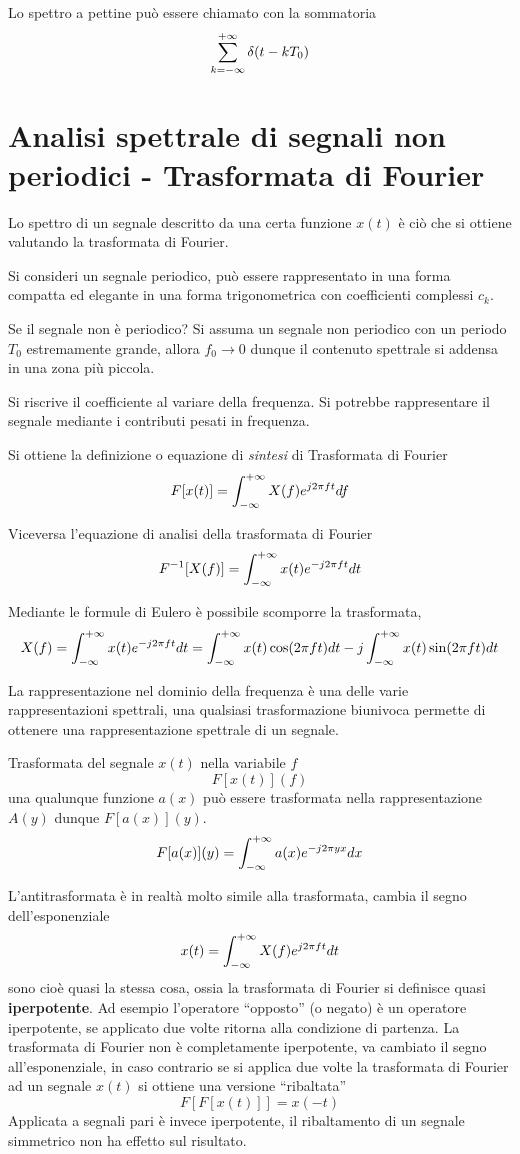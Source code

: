 Lo spettro a pettine può essere chiamato con la sommatoria
$$
\sum_{k=-\infty}^{+\infty} \delta(t-kT_0)
$$


\section{Analisi spettrale di segnali non periodici - Trasformata di Fourier}
Lo spettro di un segnale descritto da una certa funzione $x(t)$ è ciò che si
ottiene valutando la trasformata di Fourier.

Si consideri un segnale periodico, può essere rappresentato in una forma
compatta ed elegante in una forma trigonometrica con coefficienti complessi
$c_k$.

Se il segnale non è periodico? Si assuma un segnale non periodico con un
periodo $T_0$ estremamente grande, allora $f_0\to 0 $ dunque il contenuto
spettrale si addensa in una zona più piccola.

Si riscrive il coefficiente al variare della frequenza. Si potrebbe
rappresentare il segnale mediante i contributi pesati in frequenza.

Si ottiene la definizione o equazione di \textit{sintesi} di Trasformata di
Fourier
$$
F[x(t)] = \int_{-\infty}^{+\infty} X(f) e^{j2\pi ft} df
$$

Viceversa l'equazione di analisi della trasformata di Fourier
$$
F^{-1}[X(f)] = \int_{-\infty}^{+\infty} x(t) e^{-j2\pi ft}dt
$$

Mediante le formule di Eulero è possibile scomporre la trasformata,
$$
X(f) = \int_{-\infty}^{+\infty} x(t) e^{-j 2\pi f t} dt =
\int_{-\infty}^{+\infty} x(t) \cos(2\pi f t) dt - j \int_{-\infty}^{+\infty}
x(t) \sin (2\pi f t) dt
$$

La rappresentazione nel dominio della frequenza è una delle varie
rappresentazioni spettrali, una qualsiasi trasformazione biunivoca permette di
ottenere una rappresentazione spettrale di un segnale.

Trasformata del segnale $x(t)$ nella variabile $f$
$$
F[x(t)](f)
$$
una qualunque funzione $a(x)$ può essere trasformata nella rappresentazione
$A(y)$ dunque $F[a(x)](y)$.
$$
F[a(x)](y) = \int_{-\infty}^{+\infty} a(x)e^{-j2\pi y x} dx
$$

L'antitrasformata è in realtà molto simile alla trasformata, cambia il segno
dell'esponenziale
$$
x(t) = \int_{-\infty}^{+\infty} X(f) e^{j2\pi f t } dt
$$
sono cioè quasi la stessa cosa, ossia la trasformata di Fourier si definisce
quasi \textbf{iperpotente}.
Ad esempio l'operatore ``opposto'' (o negato) è un operatore iperpotente, se
applicato due volte ritorna alla condizione di partenza.
La trasformata di Fourier non è completamente iperpotente, va cambiato il segno
all'esponenziale, in caso contrario se si applica due volte la trasformata di
Fourier ad un segnale $x(t)$ si ottiene una versione ``ribaltata''
$$
F \left[F [x(t)]\right] = x(-t)
$$
Applicata a segnali pari è invece iperpotente, il ribaltamento di un
segnale simmetrico non ha effetto sul risultato.

